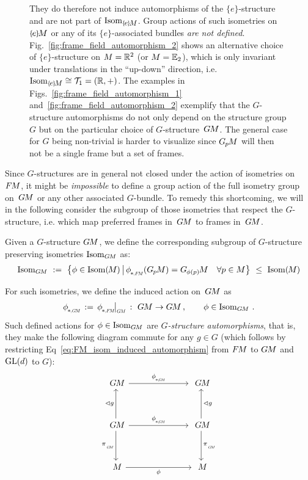 \begin{figure}
{        They do therefore not induce automorphisms of the $\{e\}$-structure and are not part of $\IsomeM$.
        Group actions of such isometries on~$\eM$ or any of its $\{e\}$-associated bundles \emph{are not defined}.
        Fig.~\ref{fig:frame_field_automorphism_2} shows an alternative choice of $\{e\}$-structure on $M = \mathbb{R}^2$ (or $M=\mathbb{E}_2$), which is only invariant under translations in the ``up-down'' direction, i.e. $\IsomeM \cong \Trans_1 = (\R,+)$.
        The examples in Figs.~\ref{fig:frame_field_automorphism_1} and~\ref{fig:frame_field_automorphism_2} exemplify that the $G$-structure automorphisms do not only depend on the structure group $G$ but on the particular choice of $G$-structure~$G\mkern-1.4muM$.
        The general case for $G$ being non-trivial is harder to visualize since $G_{\mkern-1.3mu p}\mkern-1.2muM$ will then not be a single frame but a set of frames.
        }
    \label{fig:frame_field_automorphism}
\end{figure}
Since $G$-structures are in general not closed under the action of isometries on~$F\mkern-1.5muM$, it might be \emph{impossible} to define a group action of the full isometry group on~$G\mkern-1.4muM$ or any other associated $G$-bundle.
To remedy this shortcoming, we will in the following consider the subgroup of those isometries that respect the $G$-structure, i.e. which map preferred frames in~$G\mkern-1.4muM$ to frames in~$G\mkern-1.4muM$.
\begin{dfn}
\label{dfn:IsomGM}
    Given a $G$-structure $G\mkern-1.4muM$, we define the corresponding subgroup of $G$-structure preserving isometries $\operatorname{Isom}_{G\mkern-1.4muM}$ as:
    \begin{align}\label{eq:isomGM_def}
        \IsomGM\ :=\ \big\{ \phi \in \IsomM \,\big|\, \dphiFM(\GpM) = \GphipM\ \ \ \forall p \in M \big\} \ \leq\ \IsomM
    \end{align}
\end{dfn}
For such isometries, we define the induced action on~$G\mkern-1.4muM$ as
\begin{align}
    \dphiGM\, :=\, \dphiFM \mkern-2mu \big|_{\scalebox{.58}{$\GM$}} \,:\ \GM \to \GM \,, \qquad \phi\in \IsomGM \,.
\end{align}
Such defined actions for $\phi \in \operatorname{Isom}_{G\mkern-1.4muM}$ are \emph{$G$-structure automorphisms}, that is, they make the following diagram commute for any $g\in G$ (which follows by restricting Eq~\eqref{eq:FM_isom_induced_automorphism} from $F\mkern-1.5muM$ to $G\mkern-1.4muM$ and $\operatorname{GL}(d)$ to $G$):
\begin{equation}\label{cd:isom_induced_GM_automorphism}
\begin{tikzcd}[column sep=70pt, row sep=35, font=\normalsize]
    \GM
        \arrow[r, "\dphiGM"]
    &
    \GM
    \\
    \GM
        \arrow[r, "\dphiGM"]
        \arrow[d, "\piGM"']
        \arrow[u, "\lhd g"]
    &
    \GM
        \arrow[d, "\piGM"]
        \arrow[u, "\lhd g"']
    \\
    M
        \arrow[r, "\phi"']
    &
    M
\end{tikzcd}
\end{equation}
